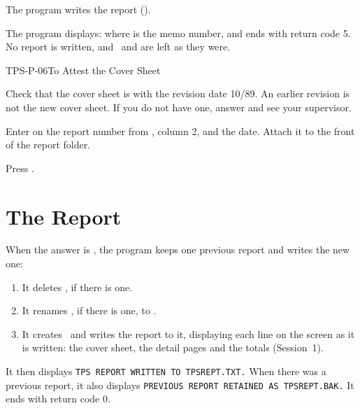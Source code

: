 The program writes the report ().

The program displays:
where  is the memo number, and ends with return code 5.  No report is
written, and \rpt\ and  are left as they were.

\begin{Procedure}{TPS-P-06}{To Attest the Cover Sheet}
\begin{ProcSteps}
\item Check that the cover sheet is  with the revision date 10/89.
  An earlier revision is not the new cover sheet.  If you do not have one,
  answer  and see your supervisor.
\item Enter on  the report number from , column 2, and the
  date.  Attach it to the front of the report folder.
\item Press .
\end{ProcSteps}
\end{Procedure}


\section{The Report}
When the answer is , the program keeps one previous report and
writes the new one:
\begin{enumerate}
\item It deletes , if there is one.
\item It renames \rpt, if there is one, to .
\item It creates \rpt\ and writes the report to it, displaying each line on
  the screen as it is written: the cover sheet, the detail pages and the
  totals (Session~1).
\end{enumerate}
It then displays \texttt{TPS REPORT WRITTEN TO TPSREPT.TXT.}  When there was
a previous report, it also displays \texttt{PREVIOUS REPORT RETAINED AS
TPSREPT.BAK.}  It ends with return code 0.


